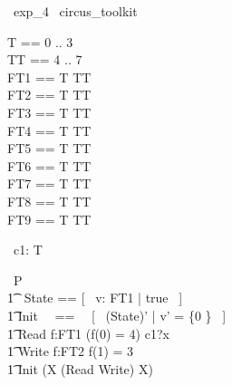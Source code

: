 
\begin{zsection}
  \SECTION\ exp\_4 \parents\ circus\_toolkit
\end{zsection}

\begin{zed}
	T == 0 .. 3 \\
	TT == 4 .. 7 \\
	FT1 == T \fun TT \\
	FT2 == T \pfun TT \\
	FT3 == T \pinj TT \\
	FT4 == T \inj TT \\
	FT5 == T \psurj TT \\
	FT6 == T \surj TT \\
	FT7 == T \bij TT \\
	FT8 == T \ffun TT \\
	FT9 == T \finj TT \\
\end{zed}

\begin{circus}
	\circchannel\ c1: T \\
\end{circus}

\begin{circus}
    \circprocess\ P \circdef \circbegin \\
        \t1 \circstate\ State == [~ v: FT1 | true ~] \\
        \t1 Init ~~==~~ [~ (State)' | v' = \{0 \} ~] \\
        \t1 Read \circdef \circvar f:FT1 \circspot \lcircguard (f(0) = 4) \rcircguard \circguard c1?x  \then \Skip \\
        \t1 Write \circdef \circvar f:FT2 \circspot \lcircguard f(1) = 3 \rcircguard \circguard \Skip \\
        \t1 \circspot \lschexpract Init \rschexpract \circseq (\circmu X \circspot (Read \extchoice Write) \circseq X) \\ 
	\circend
\end{circus}

